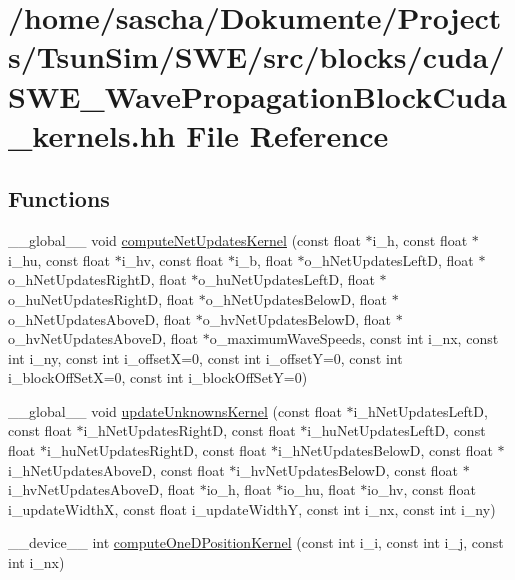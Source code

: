 \hypertarget{SWE__WavePropagationBlockCuda__kernels_8hh}{\section{/home/sascha/\-Dokumente/\-Projects/\-Tsun\-Sim/\-S\-W\-E/src/blocks/cuda/\-S\-W\-E\-\_\-\-Wave\-Propagation\-Block\-Cuda\-\_\-kernels.hh File Reference}
\label{SWE__WavePropagationBlockCuda__kernels_8hh}
}
\subsection*{Functions}
\begin{DoxyCompactItemize}
\item 
\-\_\-\-\_\-global\-\_\-\-\_\- void \hyperlink{SWE__WavePropagationBlockCuda__kernels_8hh_a2bc584d7ead34df704e1c977c38c98bf}{compute\-Net\-Updates\-Kernel} (const float $\ast$i\-\_\-h, const float $\ast$i\-\_\-hu, const float $\ast$i\-\_\-hv, const float $\ast$i\-\_\-b, float $\ast$o\-\_\-h\-Net\-Updates\-Left\-D, float $\ast$o\-\_\-h\-Net\-Updates\-Right\-D, float $\ast$o\-\_\-hu\-Net\-Updates\-Left\-D, float $\ast$o\-\_\-hu\-Net\-Updates\-Right\-D, float $\ast$o\-\_\-h\-Net\-Updates\-Below\-D, float $\ast$o\-\_\-h\-Net\-Updates\-Above\-D, float $\ast$o\-\_\-hv\-Net\-Updates\-Below\-D, float $\ast$o\-\_\-hv\-Net\-Updates\-Above\-D, float $\ast$o\-\_\-maximum\-Wave\-Speeds, const int i\-\_\-nx, const int i\-\_\-ny, const int i\-\_\-offset\-X=0, const int i\-\_\-offset\-Y=0, const int i\-\_\-block\-Off\-Set\-X=0, const int i\-\_\-block\-Off\-Set\-Y=0)
\item 
\-\_\-\-\_\-global\-\_\-\-\_\- void \hyperlink{SWE__WavePropagationBlockCuda__kernels_8hh_a8b864dfc09bf8e43d7f2849fb74add2e}{update\-Unknowns\-Kernel} (const float $\ast$i\-\_\-h\-Net\-Updates\-Left\-D, const float $\ast$i\-\_\-h\-Net\-Updates\-Right\-D, const float $\ast$i\-\_\-hu\-Net\-Updates\-Left\-D, const float $\ast$i\-\_\-hu\-Net\-Updates\-Right\-D, const float $\ast$i\-\_\-h\-Net\-Updates\-Below\-D, const float $\ast$i\-\_\-h\-Net\-Updates\-Above\-D, const float $\ast$i\-\_\-hv\-Net\-Updates\-Below\-D, const float $\ast$i\-\_\-hv\-Net\-Updates\-Above\-D, float $\ast$io\-\_\-h, float $\ast$io\-\_\-hu, float $\ast$io\-\_\-hv, const float i\-\_\-update\-Width\-X, const float i\-\_\-update\-Width\-Y, const int i\-\_\-nx, const int i\-\_\-ny)
\item 
\-\_\-\-\_\-device\-\_\-\-\_\- int \hyperlink{SWE__WavePropagationBlockCuda__kernels_8hh_aa1828414f270d255b05e877dd2f8b7df}{compute\-One\-D\-Position\-Kernel} (const int i\-\_\-i, const int i\-\_\-j, const int i\-\_\-nx)
\end{DoxyCompactItemize}


